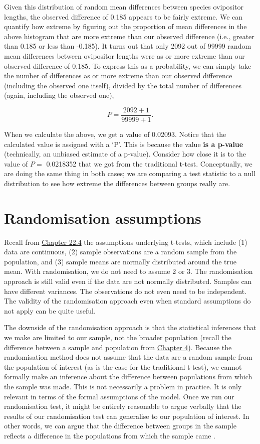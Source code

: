 \documentclass[
  openany]{krantz}
\begin{document}
Given this distribution of random mean differences between species ovipositor lengths, the observed difference of 0.185 appears to be fairly extreme.
We can quantify how extreme by figuring out the proportion of mean differences in the above histogram that are more extreme than our observed difference (i.e., greater than 0.185 or less than -0.185).
It turns out that only 2092 out of 99999 random mean differences between ovipositor lengths were as or more extreme than our observed difference of 0.185.
To express this as a probability, we can simply take the number of differences as or more extreme than our observed difference (including the observed one itself), divided by the total number of differences (again, including the observed one),

\[P = \frac{2092 + 1}{99999 + 1}.\]

When we calculate the above, we get a value of 0.02093.
Notice that the calculated value is assigned with a `P'.
This is because the value \textbf{is a p-value} (technically, an unbiased estimate of a p-value). Consider how close it is to the value of \(P =\) 0.0218352 that we got from the traditional t-test.
Conceptually, we are doing the same thing in both cases; we are comparing a test statistic to a null distribution to see how extreme the differences between groups really are.

\hypertarget{randomisation-assumptions}{%
\section{Randomisation assumptions}\label{randomisation-assumptions}}

Recall from \protect\hyperlink{assumptions-of-t-tests}{Chapter 22.4} the assumptions underlying t-tests, which include (1) data are continuous, (2) sample observations are a random sample from the population, and (3) sample means are normally distributed around the true mean.
With randomisation, we do not need to assume 2 or 3.
The randomisation approach is still valid even if the data are not normally distributed.
Samples can have different variances.
The observations do not even need to be independent.
The validity of the randomisation approach even when standard assumptions do not apply can be quite useful.

The downside of the randomisation approach is that the statistical inferences that we make are limited to our sample, not the broader population (recall the difference between a sample and population from \protect\hyperlink{Chapter_4}{Chapter 4}).
Because the randomisation method does not assume that the data are a random sample from the population of interest (as is the case for the traditional t-test), we cannot formally make an inference about the difference between populations from which the sample was made.
This is not necessarily a problem in practice.
It is only relevant in terms of the formal assumptions of the model.
Once we run our randomisation test, it might be entirely reasonable to argue verbally that the results of our randomisation test can generalise to our population of interest.
In other words, we can argue that the difference between groups in the sample reflects a difference in the populations from which the sample came \citep{Ludbrook1998, Ernst2004}.
\end{document}
